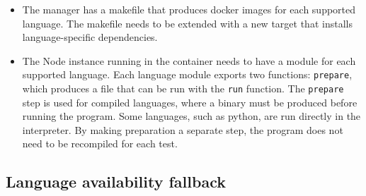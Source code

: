 \begin{itemize}
\item The manager has a makefile that produces docker images for each supported language. The makefile needs to be extended with a new target that installs language-specific dependencies.

\item The Node instance running in the container needs to have a module for each supported language. Each language module exports two functions: \texttt{prepare}, which produces a file that can be run with the \texttt{run} function. The \texttt{prepare} step is used for compiled languages, where a binary must be produced before running the program. Some languages, such as python, are run directly in the interpreter. By making preparation a separate step, the program does not need to be recompiled for each test.
\end{itemize}

\subsection{Language availability fallback}
